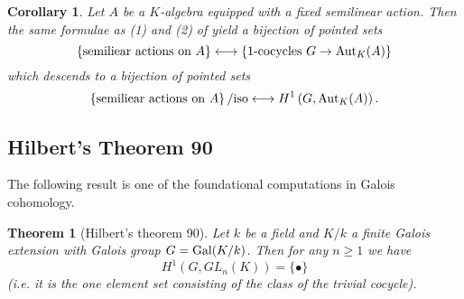 \documentclass[11pt]{amsart}
\numberwithin{equation}{section}
\newtheorem{theorem}[equation]{Theorem}
\newtheorem{cor}[equation]{Corollary}
\theoremstyle{remark}
\theoremstyle{remark}
\theoremstyle{remark}
\theoremstyle{definition}
\theoremstyle{definition}
\theoremstyle{definition}
\theoremstyle{definition}
\theoremstyle{definition}
\theoremstyle{definition}
\begin{document}
\begin{cor}
Let $A$ be a $K$-algebra equipped with a fixed semilinear action. Then the same formulae as (1) and (2) of  yield a bijection of pointed sets \[\left\{\textup{semiliear actions on }A\right\}\longleftrightarrow \left\{\textup{1-cocycles }G\rightarrow \textup{Aut}_K(A)\right\}\]
which descends to a bijection of pointed sets
\[\left\{\textup{semiliear actions on }A\right\}/\textup{iso}\longleftrightarrow H^1\left(G,\textup{Aut}_K(A)\right).\]
\end{cor}

\subsection{Hilbert's Theorem 90}

The following result is one of the foundational computations in Galois cohomology. %

\begin{theorem}[Hilbert's theorem 90] \label{hilbert 90}
Let $k$ be a field and $K/k$ a finite Galois extension with Galois group $G=\textup{Gal}(K/k)$. Then for any $n\geq 1$ we have
\[H^1\left(G,GL_n(K)\right)=\{\bullet \}\]
(i.e. it is the one element set consisting of the class of the trivial cocycle).
\end{theorem}
\end{document}
